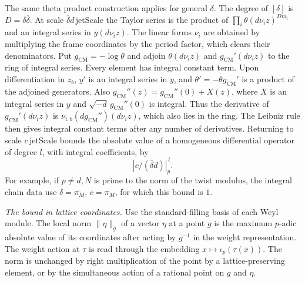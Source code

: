 The same theta product construction applies for general \(\delta\).
The degree of \([\delta]\) is \(D=\delta\overline\delta\). At scale
\(\overline\delta d\,\mathrm{jetScale}\) the Taylor series is the product
of \(\prod_i\theta(d\nu_i z)^{D m_i}\) and an integral series in
\(y(d\nu_i z)\). The linear forms \(\nu_i\) are obtained by multiplying
the frame coordinates by the period factor, which clears their
denominators. Put \(g_\mathrm{CM}=-\log\theta\) and adjoin
\(\theta(d\nu_i z)\) and \(g_\mathrm{CM}'(d\nu_i z)\) to the ring of
integral series. Every element has integral constant term.
Upon differentiation in \(z_b\), \(y'\) is an integral series in
\(y\), and \(\theta'=-\theta g_\mathrm{CM}'\) is a product of the adjoined
generators. Also \(g_\mathrm{CM}''(z)=g_\mathrm{CM}''(0)+X(z)\), where \(X\)
is an integral series in \(y\) and \(\sqrt{-d}\,g_\mathrm{CM}''(0)\) is
integral. Thus the derivative of \(g_\mathrm{CM}'(d\nu_i z)\) is
\(\nu_{i,b}(d g_\mathrm{CM}'')(d\nu_i z)\), which also lies in the ring.
The Leibniz rule then gives integral constant terms after any
number of derivatives. Returning to scale \(c\,\mathrm{jetScale}\)
bounds the absolute value of a homogeneous differential operator
of degree \(l\), with integral coefficients, by
\begin{equation}\label{eq:upper-all-prime-jets}
 \left|c/(\overline\delta d)\right|_p^{\,l}.
\end{equation}
For example, if \(p\ne d,N\) is prime to the norm of the twist
modulus, the integral chain data use \(\delta=\overline{\pi_M}\),
\(c=\pi_M\), for which this bound is \(1\).

\emph{The bound in lattice coordinates.}
Use the standard-filling basis of each Weyl module.
The local norm \(\|\eta\|_g\) of a vector \(\eta\) at a point \(g\)
is the maximum \(p\)-adic absolute value of its coordinates after
acting by \(g^{-1}\) in the weight representation.
The weight action at \(\tau\) is read through the embedding
\(x\mapsto\iota_p(\tau(\overline x))\). The norm is unchanged by
right multiplication of the point by a lattice-preserving element,
or by the simultaneous action of a rational point on \(g\) and \(\eta\).

